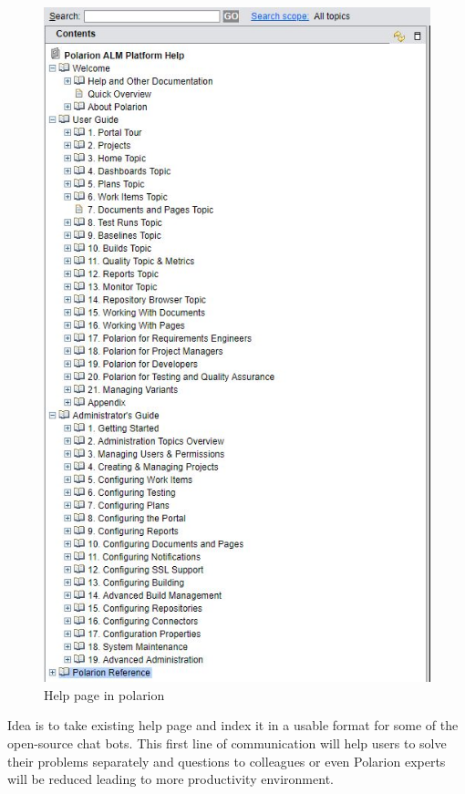 \documentclass[thesis=M,english]{FITthesis}[2012/06/26]
\begin{document}
\begin{figure}[p!]\centering
	\includegraphics[width=1\textwidth]{pictures/polarion_help}
	\caption{Help page in \acrshort{polarion}}\label{fig:polarion_help}
\end{figure}

Idea is to take existing help page and index it in a usable format for some of the open-source chat bots. This first line of communication will help users to solve their problems separately and questions to colleagues or even Polarion experts will be reduced leading to more productivity environment.  
\end{document}
